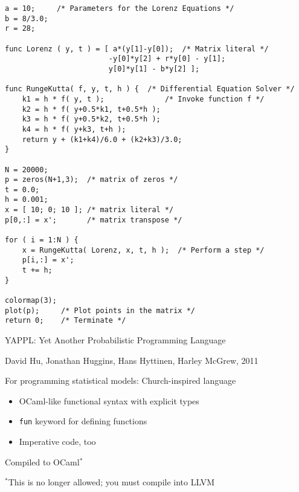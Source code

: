 \documentclass{plt}
\begin{document}
\begin{frame}[fragile]

\fontsize{7.8pt}{7.8pt}\selectfont\baselineskip=0pt
\begin{verbatim}
a = 10;     /* Parameters for the Lorenz Equations */
b = 8/3.0;
r = 28;

func Lorenz ( y, t ) = [ a*(y[1]-y[0]);  /* Matrix literal */
                        -y[0]*y[2] + r*y[0] - y[1];
                        y[0]*y[1] - b*y[2] ];

func RungeKutta( f, y, t, h ) {  /* Differential Equation Solver */
    k1 = h * f( y, t );              /* Invoke function f */
    k2 = h * f( y+0.5*k1, t+0.5*h );
    k3 = h * f( y+0.5*k2, t+0.5*h );
    k4 = h * f( y+k3, t+h );
    return y + (k1+k4)/6.0 + (k2+k3)/3.0;
}

N = 20000;
p = zeros(N+1,3);  /* matrix of zeros */
t = 0.0;
h = 0.001;
x = [ 10; 0; 10 ]; /* matrix literal */
p[0,:] = x';       /* matrix transpose */
 
for ( i = 1:N ) {
    x = RungeKutta( Lorenz, x, t, h );  /* Perform a step */
    p[i,:] = x';
    t += h;
}
 
colormap(3);
plot(p);     /* Plot points in the matrix */
return 0;    /* Terminate */
\end{verbatim}

\end{frame}

\begin{frame}[fragile]{YAPPL: Yet Another Probabilistic Programming Language}

{\small David Hu, Jonathan Huggins, Hans Hyttinen, Harley McGrew, 2011}

For programming statistical models: Church-inspired language

\begin{itemize}
\item  OCaml-like functional syntax with explicit types
\item \verb|fun| keyword for defining functions
\item Imperative code, too
\end{itemize}

Compiled to OCaml$^*$

$^*$This is no longer allowed; you must compile into LLVM

\end{frame}
\end{document}
